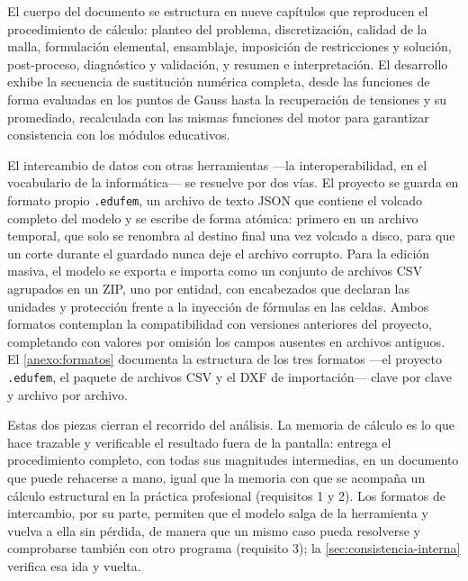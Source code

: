 El cuerpo del documento se estructura en nueve capítulos que reproducen el procedimiento de cálculo: planteo del problema, discretización, calidad de la malla, formulación elemental, ensamblaje, imposición de restricciones y solución, post-proceso, diagnóstico y validación, y resumen e interpretación. El desarrollo exhibe la secuencia de sustitución numérica completa, desde las funciones de forma evaluadas en los puntos de Gauss hasta la recuperación de tensiones y su promediado, recalculada con las mismas funciones del motor para garantizar consistencia con los módulos educativos.

El intercambio de datos con otras herramientas —la interoperabilidad, en el vocabulario de la informática— se resuelve por dos vías. El proyecto se guarda en formato propio \texttt{.edufem}, un archivo de texto JSON que contiene el volcado completo del modelo y se escribe de forma atómica: primero en un archivo temporal, que solo se renombra al destino final una vez volcado a disco, para que un corte durante el guardado nunca deje el archivo corrupto. Para la edición masiva, el modelo se exporta e importa como un conjunto de archivos CSV agrupados en un ZIP, uno por entidad, con encabezados que declaran las unidades y protección frente a la inyección de fórmulas en las celdas. Ambos formatos contemplan la compatibilidad con versiones anteriores del proyecto, completando con valores por omisión los campos ausentes en archivos antiguos. El \autoref{anexo:formatos} documenta la estructura de los tres formatos —el proyecto \texttt{.edufem}, el paquete de archivos CSV y el DXF de importación— clave por clave y archivo por archivo.

Estas dos piezas cierran el recorrido del análisis. La memoria de cálculo es lo que hace trazable y verificable el resultado fuera de la pantalla: entrega el procedimiento completo, con todas sus magnitudes intermedias, en un documento que puede rehacerse a mano, igual que la memoria con que se acompaña un cálculo estructural en la práctica profesional (requisitos 1 y 2). Los formatos de intercambio, por su parte, permiten que el modelo salga de la herramienta y vuelva a ella sin pérdida, de manera que un mismo caso pueda resolverse y comprobarse también con otro programa (requisito 3); la \autoref{sec:consistencia-interna} verifica esa ida y vuelta.
